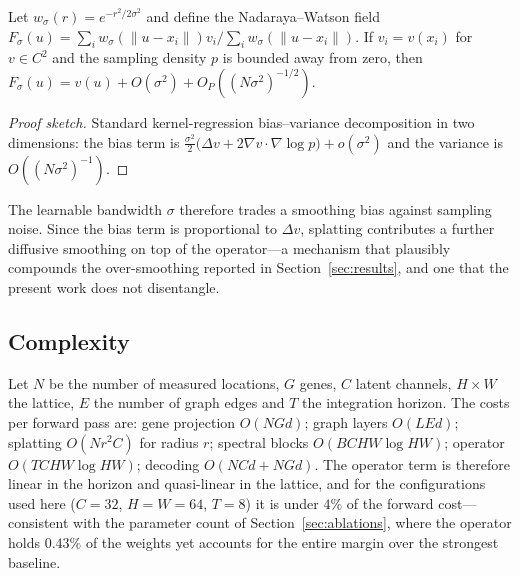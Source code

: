 \begin{proposition}
\label{prop:splat}
Let $w_\sigma(r)=e^{-r^2/2\sigma^2}$ and define the Nadaraya--Watson field
$F_\sigma(u) = \sum_i w_\sigma(\|u-x_i\|)v_i / \sum_i w_\sigma(\|u-x_i\|)$. If
$v_i = v(x_i)$ for $v\in C^2$ and the sampling density $p$ is bounded away from
zero, then $F_\sigma(u) = v(u) + O(\sigma^2) + O_P((N\sigma^2)^{-1/2})$.
\end{proposition}

\begin{proof}[Proof sketch]
Standard kernel-regression bias--variance decomposition in two dimensions: the
bias term is $\tfrac{\sigma^2}{2}\big(\Delta v + 2\nabla v\cdot\nabla\log p\big)
+o(\sigma^2)$ and the variance is $O((N\sigma^2)^{-1})$.
\end{proof}

The learnable bandwidth $\sigma$ therefore trades a smoothing bias against
sampling noise. Since the bias term is proportional to $\Delta v$, splatting
contributes a further diffusive smoothing on top of the operator---a mechanism
that plausibly compounds the over-smoothing reported in
Section~\ref{sec:results}, and one that the present work does not disentangle.

\subsection*{Complexity}
\label{app:complexity}

Let $N$ be the number of measured locations, $G$ genes, $C$ latent channels,
$H\times W$ the lattice, $E$ the number of graph edges and $T$ the integration
horizon. The costs per forward pass are: gene projection $O(NGd)$; graph layers
$O(LEd)$; splatting $O(Nr^2C)$ for radius $r$; spectral blocks
$O(BCHW\log HW)$; operator $O(TCHW\log HW)$; decoding $O(NCd + NGd)$. The
operator term is therefore linear in the horizon and quasi-linear in the lattice,
and for the configurations used here ($C{=}32$, $H{=}W{=}64$, $T{=}8$) it is
under $4\%$ of the forward cost---consistent with the parameter count of
Section~\ref{sec:ablations}, where the operator holds $0.43\%$ of the weights yet
accounts for the entire margin over the strongest baseline.
